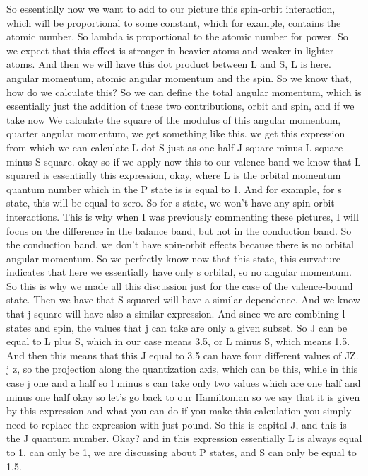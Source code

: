 So essentially now we want to add to our picture this spin-orbit interaction, which will be proportional to some constant, which for example, contains the atomic number. So lambda is proportional to the atomic number for power. So we expect that this effect is stronger in heavier atoms and weaker in lighter atoms. And then we will have this dot product between L and S, L is here. angular momentum, atomic angular momentum and the spin. So we know that, how do we calculate this? So we can define the total angular momentum, which is essentially just the addition of these two contributions, orbit and spin, and if we take now We calculate the square of the modulus of this angular momentum, quarter angular momentum, we get something like this. we get this expression from which we can calculate L dot S just as one half J square minus L square minus S square. okay so if we apply now this to our valence band we know that L squared is essentially this expression, okay, where L is the orbital momentum quantum number which in the P state is is equal to 1. And for example, for s state, this will be equal to zero. So for s state, we won't have any spin orbit interactions. This is why when I was previously commenting these pictures, I will focus on the difference in the balance band, but not in the conduction band. So the conduction band, we don't have spin-orbit effects because there is no orbital angular momentum. So we perfectly know now that this state, this curvature indicates that here we essentially have only s orbital, so no angular momentum. So this is why we made all this discussion just for the case of the valence-bound state. Then we have that S squared will have a similar dependence. And we know that j square will have also a similar expression. And since we are combining l states and spin, the values that j can take are only a given subset. So J can be equal to L plus S, which in our case means 3.5, or L minus S, which means 1.5. And then this means that this J equal to 3.5 can have four different values of JZ. j z, so the projection along the quantization axis, which can be this, while in this case j one and a half so l minus s can take only two values which are one half and minus one half okay so let's go back to our Hamiltonian so we say that it is given by this expression and what you can do if you make this calculation you simply need to replace the expression with just pound. So this is capital J, and this is the J quantum number. Okay? and in this expression essentially L is always equal to 1, can only be 1, we are discussing about P states, and S can only be equal to 1.5.
